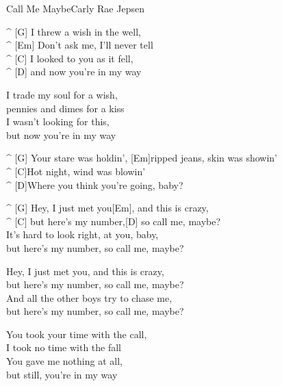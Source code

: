 \begin{song}{Call Me Maybe}{Carly Rae Jepsen}

\begin{guitar}
^ [G] I threw a wish in the well,\\
^ [Em] Don't ask me, I'll never tell\\
^ [C] I looked to you as it fell,\\
^ [D] and now you're in my way\\
\end{guitar}

\begin{guitar}
I trade my soul for a wish,\\
pennies and dimes for a kiss\\
I wasn't looking for this,\\
but now you're in my way\\
\end{guitar}

\begin{guitar}
^ [G] Your stare was holdin', [Em]ripped jeans, skin was showin'\\
^ [C]Hot night, wind was blowin'\\
^ [D]Where you think you're going, baby?\\
\end{guitar}

\begin{guitar}
^ [G] Hey, I just met you[Em], and this is crazy,\\
^ [C] but here's my number,[D] so call me, maybe?\\
It's hard to look right, at you, baby,\\
but here's my number, so call me, maybe?\\
\end{guitar}

\begin{guitar}
Hey, I just met you, and this is crazy,\\
but here's my number, so call me, maybe?\\
And all the other boys try to chase me,\\
but here's my number, so call me, maybe?\\
\end{guitar}

\begin{guitar}
You took your time with the call,\\
I took no time with the fall\\
You gave me nothing at all,\\
but still, you're in my way\\
\end{guitar}


\end{song}
